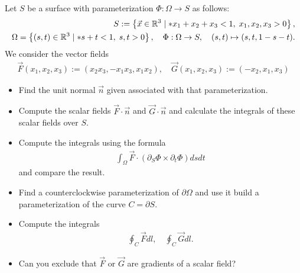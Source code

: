 \documentclass[11pt]{article}
\begin{document}
\begin{exercise} %
    Let $S$ be a surface with parameterization $\Phi : \Omega \to S$ as follows:
    \begin{align}
     S := \left\{ \vec x \in \bbR^3 \suchthat* x_1 + x_2 + x_3 < 1, \; x_1, x_2, x_3 > 0 \right\},
     \\
     \Omega = \left\{ (s,t) \in \bbR^3 \suchthat* s + t < 1, \; s, t > 0 \right\},
     \quad 
     \Phi : \Omega \to S, \quad (s,t) \mapsto (s,t,1-s-t).
    \end{align}
    We consider the vector fields 
    \begin{align}
        \vec F(x_1,x_2,x_3) := (x_2 x_3, -x_1 x_3, x_1 x_2), \quad \vec G(x_1,x_2,x_3) := (-x_2, x_1,x_3)
    \end{align}
    \begin{itemize}
     \item
     Find the unit normal $\vec n$ given associated with that parameterization.
     \item
     Compute the scalar fields $\vec F \cdot \vec n$ and $\vec G \cdot \vec n$ and calculate the integrals of these scalar fields over $S$.
     \item
     Compute the integrals using the formula 
     \begin{align}
        \int_\Omega \vec F \cdot ( \partial_S \Phi \times \partial_t \Phi ) dsdt
     \end{align}
     and compare the result. 
     \item 
     Find a counterclockwise parameterization of $\partial\Omega$ and use it build a parameterization of the curve $C = \partial S$.
     \item 
     Compute the integrals 
     \begin{align}
        \oint_C \vec F dl, \quad \oint_C \vec G dl.
     \end{align}
     \item 
     Can you exclude that $\vec F$ or $\vec G$ are gradients of a scalar field?
    \end{itemize}
\end{exercise}
\end{document}
